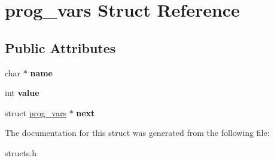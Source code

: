 \hypertarget{structprog__vars}{\section{prog\-\_\-vars Struct Reference}
\label{structprog__vars}
}
\subsection*{Public Attributes}
\begin{DoxyCompactItemize}
\item 
\hypertarget{structprog__vars_a1f0c965c51ead53028547e4612168460}{char $\ast$ {\bfseries name}}\label{structprog__vars_a1f0c965c51ead53028547e4612168460}

\item 
\hypertarget{structprog__vars_a5c43eb3eef348c504a9cafd34eda5892}{int {\bfseries value}}\label{structprog__vars_a5c43eb3eef348c504a9cafd34eda5892}

\item 
\hypertarget{structprog__vars_a124178c04442684131e1acbef3c0d85e}{struct \hyperlink{structprog__vars}{prog\-\_\-vars} $\ast$ {\bfseries next}}\label{structprog__vars_a124178c04442684131e1acbef3c0d85e}

\end{DoxyCompactItemize}


The documentation for this struct was generated from the following file\-:\begin{DoxyCompactItemize}
\item 
structs.\-h\end{DoxyCompactItemize}

